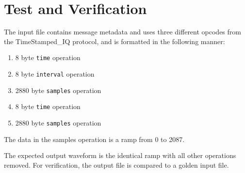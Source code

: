 \section*{Test and Verification}
\begin{flushleft}
	The input file contains message metadata and uses three different opcodes from the TimeStamped\_IQ protocol, and is formatted in the following manner:
	\begin{enumerate} 
	\item 8 byte \texttt{time} operation
	\item 8 byte \texttt{interval} operation
	\item 2880 byte \texttt{samples} operation	
	\item 8 byte \texttt{time} operation
	\item 2880 byte \texttt{samples} operation	
	\end{enumerate}
	The data in the samples operation is a ramp from 0 to 2087.\par\medskip 
	The expected output waveform is the identical ramp with all other operations removed. For verification, the output file is compared to a golden input file.
\end{flushleft}

